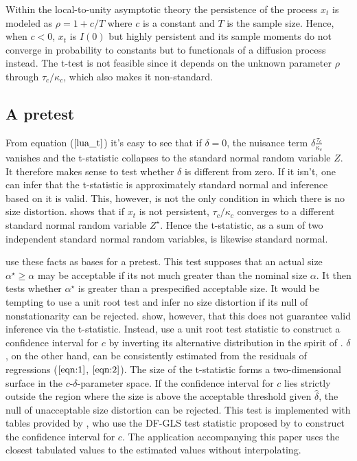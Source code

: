 \documentclass[11pt, a4paper]{article}
\begin{document}
Within the local-to-unity asymptotic theory the persistence of the process $x_{t}$ is modeled as $\rho=1+c / T$ where $c$ is a constant and $T$ is the sample size. Hence, when $c<0$, $x_{t}$ is $I(0)$ but highly persistent and its sample moments do not converge in probability to constants but to functionals of a diffusion process instead. The t-test is not feasible since it depends on the unknown parameter $\rho$ through $\tau_{c} / \kappa_{c}$, which also makes it non-standard. 

\subsection{A pretest}
\label{pretest}
From equation ($\ref{lua_t}$) it's easy to see that if $\delta = 0$, the nuisance term $\delta \frac{\tau_{c}}{\kappa_{c}}$ vanishes and the t-statistic collapses to the standard normal random variable $Z$. It therefore makes sense to test whether $\delta$ is different from zero. If it isn't, one can infer that the t-statistic is approximately standard normal and inference based on it is valid. This, however, is not the only condition in which there is no size distortion. \citet{phillips1987towards} shows that if $x_{t}$ is not persistent, $\tau_{c} / \kappa_{c}$ converges to a different standard normal random variable $Z^{\star}$. Hence the t-statistic, as a sum of two independent standard normal random variables, is likewise standard normal. 

\citet{campbell2006efficient} use these facts as bases for a pretest. This test supposes that an actual size $\alpha^{\star}  \geq \alpha$ may be acceptable if its not much greater than the nominal size $\alpha$. It then tests whether $\alpha^{\star}$ is greater than a prespecified acceptable size. It would be tempting to use a unit root test and infer no size distortion if its null of nonstationarity can be rejected. \citet{elliott1994inference} show, however, that this does not guarantee valid inference via the t-statistic. Instead, \citet{campbell2006efficient} use a unit root test statistic to construct a confidence interval for $c$ by inverting its alternative distribution in the spirit of \citet{stock1991confidence}. $\delta$, on the other hand, can be consistently estimated from the residuals of regressions ($\ref{eqn:1}$, $\ref{eqn:2}$). The size of the t-statistic forms a two-dimensional surface in the $c$-$\delta$-parameter space. If the confidence interval for $c$ lies strictly outside the region where the size is above the acceptable threshold given $\hat{\delta}$, the null of unacceptable size distortion can be rejected. This test is implemented with tables provided by \citet{campbell2006efficient}, who use the DF-GLS test statistic proposed by \citet{elliott1996efficient} to construct the confidence interval for $c$. The application accompanying this paper uses the closest tabulated values to the estimated values without interpolating.
\end{document}
